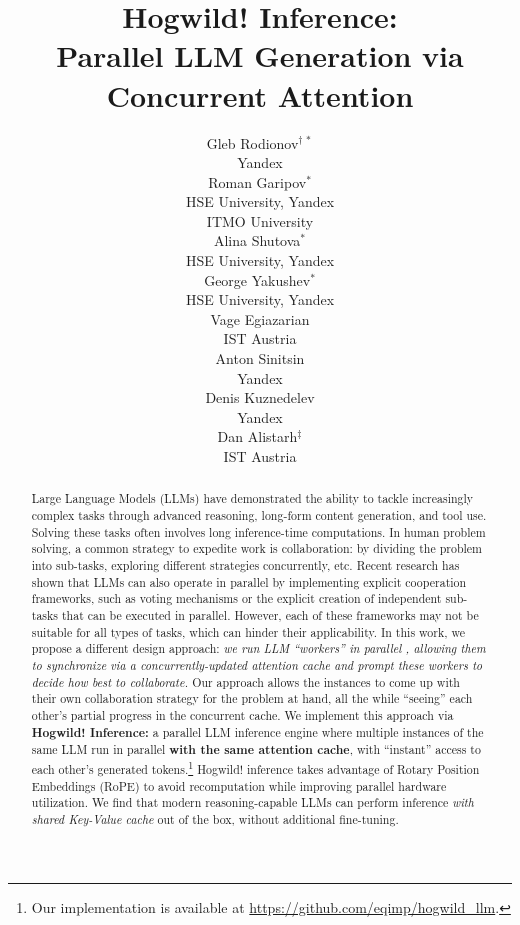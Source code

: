 \documentclass{article}
\title{Hogwild! Inference: \\ Parallel LLM Generation via  Concurrent Attention}
\author{%
  \!\!\!Gleb Rodionov$^{\dagger\,*}$\\
  \!\!\!Yandex \\
  \And
  \!\!\!Roman Garipov$^*$ \\
  \!\!\!HSE University, Yandex \\ ITMO University \\
  \And
  \!\!\!Alina Shutova$^*$ \\
  \!\!\!HSE University, Yandex \\
  \And
  \!\!\!George Yakushev$^*$ \!\!\! \\
  \!\!\!HSE University, Yandex\!\!\! \\
  \And
  Vage Egiazarian  \\
  IST Austria \\
  \And
  Anton Sinitsin \\
  Yandex\\
  \And
  Denis Kuznedelev \\
  Yandex \\
  \And
  Dan Alistarh$^\ddagger$\\%
  IST Austria\\
}
\theoremstyle{plain}
\theoremstyle{definition}
\theoremstyle{remark}
\begin{document}
\maketitle


\vspace{-8px}\begin{abstract}
    Large Language Models (LLMs) have demonstrated the ability to tackle increasingly complex tasks through advanced reasoning, long-form content generation, and tool use.
    Solving these tasks often involves long inference-time computations.
    In human problem solving, a common strategy to expedite work is collaboration: by dividing the problem into sub-tasks, exploring different strategies concurrently, etc. Recent research has shown that LLMs can also operate in parallel by implementing explicit cooperation frameworks, such as voting mechanisms or the explicit creation of independent sub-tasks that can be executed in parallel. However, each of these frameworks may not be suitable for all types of tasks, which can hinder their applicability.
    In this work, we propose a different design approach: \textit{we run LLM ``workers'' in parallel , allowing them to synchronize via a concurrently-updated attention cache and prompt these workers to decide how best to collaborate.} Our approach allows the instances to come up with their own collaboration strategy for the problem at hand, all the while ``seeing'' each other's partial progress in the concurrent cache.
    We implement this approach via \textbf{Hogwild! Inference:} a parallel LLM inference engine where multiple instances of the same LLM run in parallel \textbf{with the same attention cache}, with ``instant''  access to each other's generated tokens.\footnote[1]{Our implementation is available at \url{https://github.com/eqimp/hogwild_llm}.} Hogwild! inference takes advantage of Rotary Position Embeddings (RoPE) to avoid recomputation while improving parallel hardware utilization.
    We find that modern reasoning-capable LLMs can perform inference \textit{with shared Key-Value cache} out of the box, without additional fine-tuning.
    
\end{abstract}

\def\thefootnote{$\dagger$} \def\thefootnote{\arabic{footnote}}
\end{document}

